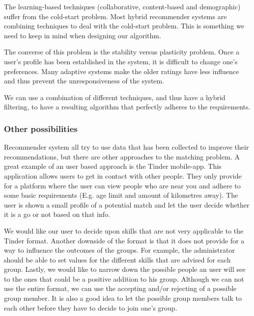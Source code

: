 The learning-based techniques (collaborative, content-based and demographic) suffer from the cold-start problem.
Most hybrid recommender systems are combining techniques to deal with the cold-start problem.
This is something we need to keep in mind when designing our algorithm.

The converse of this problem is the stability versus plasticity problem.
Once a user's profile has been established in the system, it is difficult to change one's preferences.
Many adaptive systems make the older ratings have less influence and thus prevent the unresponsiveness of the system.

We can use a combination of different techniques, and thus have a hybrid filtering, to have a resulting algorithm that perfectly adheres to the requirements.

\subsubsection*{Other possibilities}
Recommender system all try to use data that has been collected to improve their recommendations, but there are other approaches to the matching problem.
A great example of an user based approach is the Tinder mobile-app.
This application allows users to get in contact with other people.
They only provide for a platform where the user can view people who are near you and adhere to some basic requirements (E.g. age limit and amount of kilometres away).
The user is shown a small profile of a potential match and let the user decide whether it is a go or not based on that info.

We would like our user to decide upon skills that are not very applicable to the Tinder format.
Another downside of the format is that it does not provide for a way to influence the outcomes of the groups.
For example, the administrator should be able to set values for the different skills that are advised for each group.
Lastly, we would like to narrow down the possible people an user will see to the ones that could be a positive addition to his group.
Although we can not use the entire format, we can use the accepting and/or rejecting of a possible group member.
It is also a good idea to let the possible group members talk to each other before they have to decide to join one's group.


